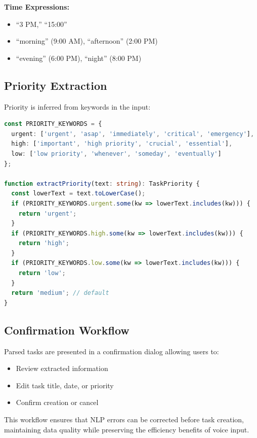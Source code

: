 \textbf{Time Expressions:}
\begin{itemize}
    \item ``3 PM,'' ``15:00''
    \item ``morning'' (9:00 AM), ``afternoon'' (2:00 PM)
    \item ``evening'' (6:00 PM), ``night'' (8:00 PM)
\end{itemize}

\subsection{Priority Extraction}

Priority is inferred from keywords in the input:

\begin{lstlisting}[language=TypeScript, caption=Priority Extraction Rules]
const PRIORITY_KEYWORDS = {
  urgent: ['urgent', 'asap', 'immediately', 'critical', 'emergency'],
  high: ['important', 'high priority', 'crucial', 'essential'],
  low: ['low priority', 'whenever', 'someday', 'eventually']
};

function extractPriority(text: string): TaskPriority {
  const lowerText = text.toLowerCase();
  if (PRIORITY_KEYWORDS.urgent.some(kw => lowerText.includes(kw))) {
    return 'urgent';
  }
  if (PRIORITY_KEYWORDS.high.some(kw => lowerText.includes(kw))) {
    return 'high';
  }
  if (PRIORITY_KEYWORDS.low.some(kw => lowerText.includes(kw))) {
    return 'low';
  }
  return 'medium'; // default
}
\end{lstlisting}

\subsection{Confirmation Workflow}

Parsed tasks are presented in a confirmation dialog allowing users to:
\begin{itemize}
    \item Review extracted information
    \item Edit task title, date, or priority
    \item Confirm creation or cancel
\end{itemize}

This workflow ensures that NLP errors can be corrected before task creation, maintaining data quality while preserving the efficiency benefits of voice input.

